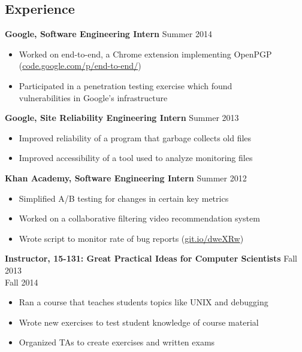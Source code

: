 \documentclass[margin]{res}
\begin{document}
\begin{resume}
\section{Experience}
  \textbf{Google, Software Engineering Intern} \hfill Summer 2014
  \begin{itemize} \itemsep -2pt  %
    \item Worked on end-to-end, a Chrome extension implementing OpenPGP\\
      (\href{https://code.google.com/p/end-to-end/}{code.google.com/p/end-to-end/})
    \item Participated in a penetration testing exercise which found \\
      vulnerabilities in Google's infrastructure
  \end{itemize}
  \textbf{Google, Site Reliability Engineering Intern}
    \hfill Summer 2013
  \begin{itemize} \itemsep -2pt  %
    \item Improved reliability of a program that garbage collects old files
    \item Improved accessibility of a tool used to analyze monitoring files
  \end{itemize}

  \textbf{Khan Academy, Software Engineering Intern} \hfill Summer 2012
  \begin{itemize} \itemsep -2pt %
  \item Simplified A/B testing for changes in certain key metrics
  \item Worked on a collaborative filtering video recommendation system
  \item Wrote script to monitor rate of bug reports
    (\href{https://github.com/Khan/beep-boop}{git.io/dweXRw})
  \end{itemize}

  \textbf{Instructor, 15-131: Great Practical Ideas for Computer Scientists}
    \hfill Fall 2013 \\ \hphantom{1em} \hfill Fall 2014

  \vspace{-1em}\vspace{-1ex}
  \begin{itemize} \itemsep -2pt
    \item Ran a course that teaches students topics like UNIX and debugging
    \item Wrote new exercises to test student knowledge of course material
    \item Organized TAs to create exercises and written exams
  \end{itemize}


\end{resume}
\end{document}
